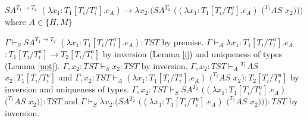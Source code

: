 \begin{case}
$SA^{T_{1}\rightarrow T_{2}}$ $(\lambda x_{1}:T_{1}[T_{i}/T_{i}^{a}].e_{A})\rightarrow\lambda x_{2}.(SA^{T_{2}}$ $((\lambda x_{1}:T_{1}[T_{i}/T_{i}^{a}].e_{A})$ $(^{T_{1}}AS$ $x_{2})))$ where $A\in\lbrace H,M\rbrace$

$\Gamma\vdash_{S}SA^{T_{1}\rightarrow T_{2}}$ $(\lambda x_{1}:T_{1}[T_{i}/T_{i}^{a}].e_{A}):TST$ by premise.  $\Gamma\vdash_{A}\lambda x_{1}:T_{1}[T_{i}/T_{i}^{a}].e_{A}$ $:T_{1}[T_{i}/T_{i}^{a}]\rightarrow T_{2}[T_{i}/T_{i}^{a}]$ by inversion (Lemma \ref{i}) and uniqueness of types (Lemma \ref{uot}).  $\Gamma,x_{2}:TST\vdash_{S}x_{2}:TST$ by inversion.  $\Gamma,x_{2}:TST\vdash_{A}{^{T_{1}}A}S$ $x_{2}:T_{1}[T_{i}/T_{i}^{a}]$ and $\Gamma,x_{2}:TST\vdash_{A}(\lambda x_{1}:T_{1}[T_{i}/T_{i}^{a}].e_{A})$ $(^{T_{1}}AS$ $x_{2}):T_{2}[T_{i}/T_{i}^{a}]$ by inversion and uniqueness of types.  $\Gamma,x_{2}:TST\vdash_{S}SA^{T_{2}}$ $((\lambda x_{1}:T_{1}[T_{i}/T_{i}^{a}].e_{A})$ $(^{T_{1}}AS$ $x_{2})):TST$ and $\Gamma\vdash_{S}\lambda x_{2}.(SA^{T_{2}}$ $((\lambda x_{1}:T_{1}[T_{i}/T_{i}^{a}].e_{A})$ $(^{T_{1}}AS$ $x_{2}))):TST$ by inversion.
\end{case}